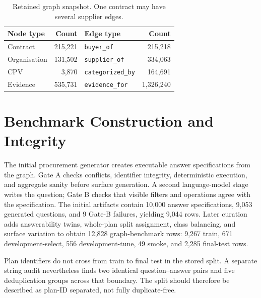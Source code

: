 \begin{table}[h]
  \centering
  \caption{Retained graph snapshot.  One contract may have several supplier edges.}
  \label{tab:kg-schema}
  \small
  \begin{tabular}{lr@{\hskip 3em}lr}
    \toprule
    Node type & Count & Edge type & Count \\
    \midrule
    Contract & 215,221 & \texttt{buyer\_of} & 215,218 \\
    Organisation & 131,502 & \texttt{supplier\_of} & 334,063 \\
    CPV & 3,870 & \texttt{categorized\_by} & 164,691 \\
    Evidence & 535,731 & \texttt{evidence\_for} & 1,326,240 \\
    \bottomrule
  \end{tabular}
\end{table}

\section{Benchmark Construction and Integrity}
\label{app:benchmark}

The initial procurement generator creates executable answer specifications from the graph.  Gate A
checks conflicts, identifier integrity, deterministic execution, and aggregate sanity before
surface generation.  A second language-model stage writes the question; Gate B checks that visible
filters and operations agree with the specification.  The initial artifacts contain 10,000 answer
specifications, 9,053 generated questions, and 9 Gate-B failures, yielding 9,044 rows.  Later
curation adds answerability twins, whole-plan split assignment, class balancing, and surface
variation to obtain 12,828 graph-benchmark rows: 9,267 train, 671 development-select, 556
development-tune, 49 smoke, and 2,285 final-test rows.

Plan identifiers do not cross from train to final test in the stored split.  A separate string
audit nevertheless finds two identical question--answer pairs and five deduplication groups across
that boundary.  The split should therefore be described as plan-ID separated, not fully
duplicate-free.

